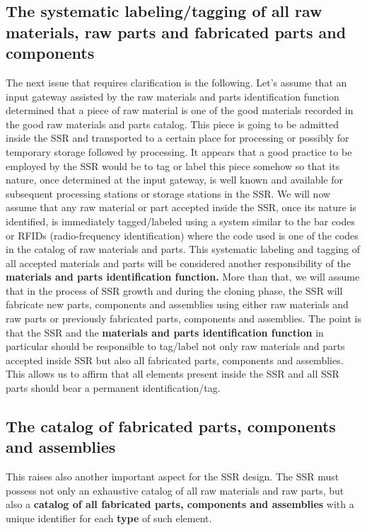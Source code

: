 \documentclass[letterpaper]{article}
\begin{document}
\subsection[The systematic labeling/tagging of all raw materials, raw
parts and fabricated parts and components]{The systematic
labeling/tagging of all raw materials, raw parts and fabricated parts
and components}
\hypertarget{RefHeading3058306210128}{}The next issue that requires
clarification is the following. Let’s assume that an input gateway
assisted by the raw materials and parts identification function
determined that a piece of raw material is one of the good materials
recorded in the good raw materials and parts catalog. This piece is
going to be admitted inside the SSR and transported to a certain place
for processing or possibly for temporary storage followed by
processing. It appears that a good practice to be employed by the SSR
would be to tag or label this piece somehow so that its nature, once
determined at the input gateway, is well known and available for
subsequent processing stations or storage stations in the SSR. We will
now assume that any raw material or part accepted inside the SSR, once
its nature is identified, is immediately tagged/labeled using a system
similar to the bar codes or RFIDs (radio-frequency identification)
where the code used is one of the codes in the catalog of raw materials
and parts. This systematic labeling and tagging of all accepted
materials and parts will be considered another responsibility of the
\textbf{materials and parts identification function. }More than that,
we will assume that in the process of SSR growth and during the cloning
phase, the SSR will fabricate new parts, components and assemblies
using either raw materials and raw parts or previously fabricated
parts, components and assemblies. The point is that the SSR and the
\textbf{materials and parts identification function }in
particular\textbf{ }should be responsible to\textbf{ }tag/label not
only raw materials and parts accepted inside SSR but also all
fabricated parts, components and assemblies. This allows us to affirm
that all elements present inside the SSR and all SSR parts should bear
a permanent identification/tag.


\bigskip

\subsection[The catalog of fabricated parts, components and
assemblies]{The catalog of fabricated parts, components and assemblies}
\hypertarget{RefHeading3060306210128}{}This raises also another
important aspect for the SSR design. The SSR must possess not only an
exhaustive catalog of all raw materials and raw parts, but also a
\textbf{catalog of all fabricated parts, components and assemblies
}with a unique identifier for each \textbf{type} of such element. 
\end{document}
